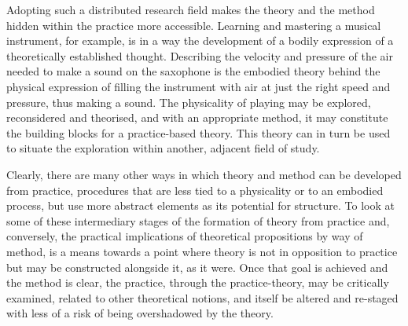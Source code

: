 \documentclass[12pt]{article}
\begin{document}
Adopting such a distributed research field makes the theory and the method hidden within the practice more accessible. Learning and mastering a musical instrument, for example, is in a way the development of a bodily expression of a theoretically established thought. Describing the velocity and pressure of the air needed to make a sound on the saxophone is the embodied theory behind the physical expression of filling the instrument with air at just the right speed and pressure, thus making a sound. The physicality of playing may be explored, reconsidered and theorised, and with an appropriate method, it may constitute the building blocks for a practice-based theory. This theory can in turn be used to situate the exploration within another, adjacent field of study. 


Clearly, there are many other ways in which theory and method can be developed from practice, procedures that are less tied to a physicality or to an embodied process, but use more abstract elements as its potential for structure. To look at some of these intermediary stages of the formation of theory from practice and, conversely, the practical implications of theoretical propositions by way of method, is a means towards a point where theory is not in opposition to practice but may be constructed alongside it, as it were. Once that goal is achieved and the method is clear, the practice, through the practice-theory, may be critically examined, related to other theoretical notions, and itself be altered and re-staged with less of a risk of being overshadowed by the theory.

\end{document}

